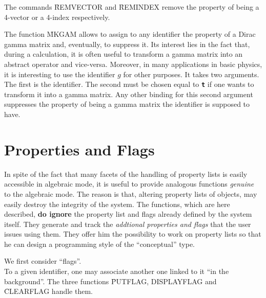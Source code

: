 The commands \f{REMVECTOR} and \f{REMINDEX} remove the property of 
being a 4-vector or a 4-index respectively. 

The function \f{MKGAM} allows to assign to any identifier the property 
of a Dirac gamma matrix and, eventually, to suppress it. Its interest lies 
in the fact that, during a calculation, it is often useful to transform 
a gamma matrix into an abstract operator and vice-versa. Moreover, in many 
applications in basic physics, it is interesting to use the identifier $g$ 
for other purposes.  
It takes two arguments. The first is the identifier. The second must be 
chosen equal to {\tt\bf t} if one wants to transform it into a gamma matrix. Any
other binding for this second argument suppresses the property of being 
a gamma matrix the identifier is supposed to have. 
\ei
\section{Properties and Flags}
In spite of the fact that many facets of the handling of
property lists is easily accessible in algebraic mode, it is useful to
provide analogous functions {\em genuine} to the algebraic mode. The reason is
that, altering property lists of objects, may easily destroy the integrity
of the system. The functions, which are here described, {\bf do ignore}
the property list and flags already defined by the system itself. They
generate and track the {\em addtional properties and flags} that the user
issues using them. They offer him
the  possibility to work on property lists so
that he can design a programming style of the ``conceptual'' type.
\bi
\item[i.] We first consider ``flags''. \\
To a given identifier, one may
associate another one linked to it ``in the background''. The  three
functions \f{PUTFLAG, DISPLAYFLAG} and \f{CLEARFLAG} handle them.

